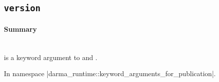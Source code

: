 \subsection{\texttt{version}}
\label{ssec:api_fe_version}

\paragraph{Summary}\mbox{}\\ 
 is a \gls{keyword argument} to  and
.  

In namespace |darma_runtime::keyword_arguments_for_publication|.

%
%
%
%



